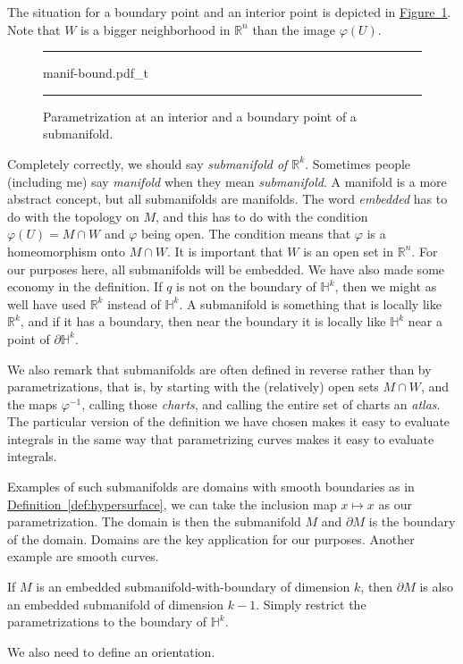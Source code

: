 \documentclass[12pt,openany]{book}
\newcommand{\R}{{\mathbb{R}}}
\newcommand{\bH}{{\mathbb{H}}}
\newcommand{\myindex}[1]{#1\index{#1}}
\theoremstyle{plain}
\theoremstyle{remark}
\theoremstyle{definition}
\newenvironment{myfig}{%
\begin{figure}[h!t]
\noindent\rule{\textwidth}{0.5pt}\vspace{12pt}\par\centering}%
{\par\noindent\rule{\textwidth}{0.5pt}
\end{figure}}
\theoremstyle{exercise}
\theoremstyle{example}
\newcommand{\figureref}[1]{\hyperref[#1]{Figure~\ref*{#1}}}
\newcommand{\defnref}[1]{\hyperref[#1]{Definition~\ref*{#1}}}
\begin{document}
The situation for a boundary point and an interior point is depicted in
\figureref{fig:maif-bound}.
Note that $W$ is a bigger neighborhood in $\R^n$ than
the image $\varphi(U)$.

\begin{myfig}
{manif-bound.pdf_t}
\caption{Parametrization at
an interior and a boundary point of a submanifold.\label{fig:maif-bound}}
\end{myfig}

Completely correctly, we should say \emph{submanifold of $\R^k$}.
Sometimes people (including me)
say \emph{\myindex{manifold}} when they mean \emph{submanifold}.
A manifold is a more abstract concept, but
all submanifolds are manifolds.
The word \emph{embedded} has to do with the topology on $M$, and this
has to do with the condition $\varphi(U) = M \cap W$ and $\varphi$ being open.
The condition means that $\varphi$ is a homeomorphism onto $M \cap W$.
It is important that $W$ is an open set in $\R^n$.  For our
purposes here, all submanifolds will be embedded.
We have also made some economy in the definition.  If $q$ is not on the
boundary of $\bH^k$, then we might as well have used $\R^k$ instead of
$\bH^k$.
A submanifold is something that is locally like $\R^k$, and if it has a
boundary, then near the boundary it is locally like $\bH^k$ near a point
of $\partial \bH^k$.

We also remark that submanifolds are often defined in reverse rather than by
parametrizations, that is, by starting with the (relatively) open sets $M \cap W$,
and the maps $\varphi^{-1}$, calling those \emph{\myindex{charts}},
and calling the entire set of charts an \emph{\myindex{atlas}}.
The particular version of the definition we have chosen makes 
it easy to evaluate integrals in the same way that parametrizing curves
makes it easy to evaluate integrals.

Examples of such submanifolds are domains with smooth boundaries
as in \defnref{def:hypersurface}, we can take the inclusion map $x \mapsto
x$ as our parametrization.  The domain is then the submanifold $M$
and $\partial M$ is the boundary of the domain.
Domains are the key application for our purposes.
Another example are smooth curves.

If $M$ is an embedded submanifold-with-boundary
of dimension $k$, then $\partial M$ is also an embedded submanifold of dimension
$k-1$.  Simply restrict the parametrizations to the boundary of $\bH^k$.

We also need to define an orientation.
\end{document}
